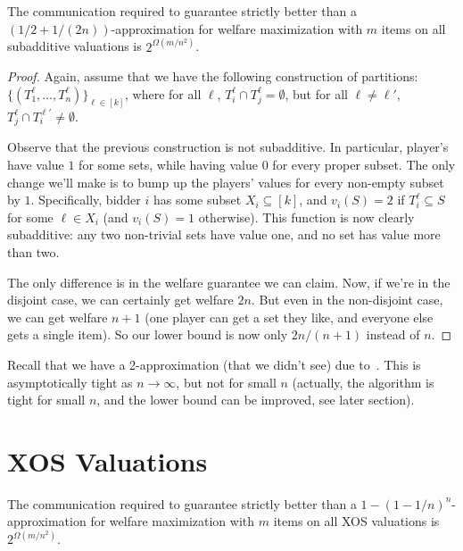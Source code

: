   \begin{theorem}The
    communication required to guarantee strictly better than a
    $(1/2+1/(2n))$-approximation for welfare maximization with $m$ items on all
    subadditive valuations is $2^{\Omega(m/n^2)}$.  
  \end{theorem} 
  \begin{proof}
    Again, assume that we have the following construction of partitions:
    $\{(T_1^\ell,\ldots, T_n^\ell)\}_{\ell \in [k]}$, where for all $\ell$,
    $T_i^\ell \cap T_j^\ell = \emptyset$, but for all $\ell \neq \ell'$,
    $T_j^\ell \cap T_i^{\ell'} \neq \emptyset$.

    Observe that the previous construction is not subadditive. In particular,
    player's have value $1$ for some sets, while having value $0$ for every proper
    subset. The only change we'll make is to bump up the players' values for every
    non-empty subset by $1$.
    Specifically, bidder $i$ has some subset $X_i \subseteq [k]$,
    and $v_i(S) = 2$ if
    $T_i^\ell \subseteq S$ for some $\ell \in X_i$ (and $v_i(S) = 1$
    otherwise). This function is now clearly subadditive: any two non-trivial sets
    have value one, and no set has value more than two. 

    The only difference is in the welfare guarantee we can claim. Now, if we're in
    the disjoint case, we can certainly get welfare $2n$. But even in the
    non-disjoint case, we can get welfare $n+1$ (one player can get a set they like,
    and everyone else gets a single item). So our lower bound is now only $2n/(n+1)$
    instead of $n$.
  \end{proof}

  Recall that we have a 2-approximation (that we didn't see) due
  to~\cite{Feige06}. This is asymptotically tight as $n\rightarrow \infty$, but
  not for small $n$ (actually, the algorithm is tight for small $n$, and the lower
  bound can be improved, see later section). 

\section{XOS Valuations}

  \begin{theorem}
    The communication
    required to guarantee strictly better than a $1-(1-1/n)^n$-approximation for
    welfare maximization with $m$ items on all XOS valuations is
    $2^{\Omega(m/n^2)}$.  
  \end{theorem}

